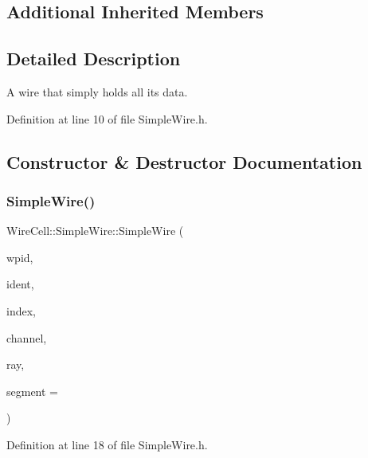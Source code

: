 \subsection*{Additional Inherited Members}


\subsection{Detailed Description}
A wire that simply holds all its data. 

Definition at line 10 of file Simple\+Wire.\+h.



\subsection{Constructor \& Destructor Documentation}
\mbox{\label{class_wire_cell_1_1_simple_wire_a22c2fdb5b8d74747e273e8854cabf691}} 
\subsubsection{\texorpdfstring{Simple\+Wire()}{SimpleWire()}}
{\footnotesize\ttfamily Wire\+Cell\+::\+Simple\+Wire\+::\+Simple\+Wire (\begin{DoxyParamCaption}\item[{\hyperlink{class_wire_cell_1_1_wire_plane_id}{Wire\+Cell\+::\+Wire\+Plane\+Id}}]{wpid,  }\item[{int}]{ident,  }\item[{int}]{index,  }\item[{int}]{channel,  }\item[{const \hyperlink{namespace_wire_cell_a3ab20d9b438feb7eb1ffaab9ba98af0c}{Wire\+Cell\+::\+Ray} \&}]{ray,  }\item[{int}]{segment = {} }\end{DoxyParamCaption})\hspace{0.3cm}{\ttfamily [inline]}}



Definition at line 18 of file Simple\+Wire.\+h.

